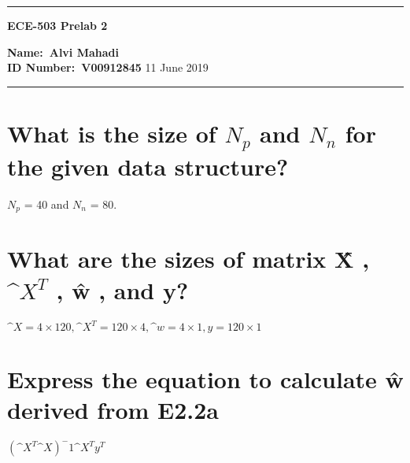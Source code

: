 \documentclass[11pt,a4paper,twoside]{article}
\begin{document}
\begin{center}
\hrule

\vspace{.4cm}
{\bf {\Huge ECE-503 Prelab 2}}
\vspace{.2cm}
\end{center}
{\bf Name:\ Alvi Mahadi }  \\
{\bf ID Number:\ V00912845} \hspace{\fill} 11 June 2019 \\
\hrule


\section{What is the size of $N_p$ and $N_n$ for the given data structure?}
$N_p$ = 40 and $N_n$ = 80.

\section{What are the sizes of matrix \^{X} , $\^{X}^T$ , \^{w} , and y?}
$\^{X}=4\times120, \^X^T=120\times4, \^{w}=4\times1, y=120\times1$
\section{Express the equation to calculate \^{w} derived from E2.2a}
$(\^X^T\^X)^-1\^X^Ty^T$
\end{document}
